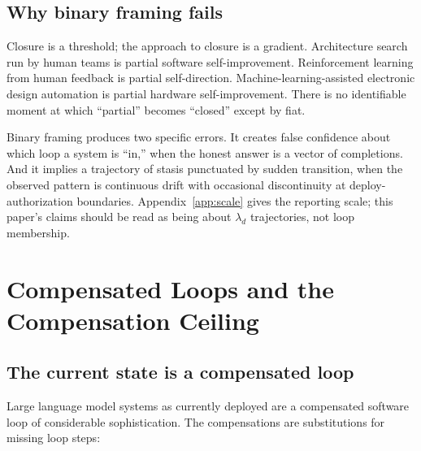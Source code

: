 \documentclass[11pt]{article}
\begin{document}
\subsection{Why binary framing fails}
\label{sec:gradient}

Closure is a threshold; the approach to closure is a gradient. Architecture search run by human teams is partial software self-improvement. Reinforcement learning from human feedback is partial self-direction. Machine-learning-assisted electronic design automation is partial hardware self-improvement. There is no identifiable moment at which ``partial'' becomes ``closed'' except by fiat.

Binary framing produces two specific errors. It creates false confidence about which loop a system is ``in,'' when the honest answer is a vector of completions. And it implies a trajectory of stasis punctuated by sudden transition, when the observed pattern is continuous drift with occasional discontinuity at deploy-authorization boundaries. Appendix~\ref{app:scale} gives the reporting scale; this paper's claims should be read as being about $\lambda_d$ trajectories, not loop membership.

\section{Compensated Loops and the Compensation Ceiling}
\label{sec:half}

\subsection{The current state is a compensated loop}

Large language model systems as currently deployed are a compensated software loop of considerable sophistication. The compensations are substitutions for missing loop steps:
\end{document}
